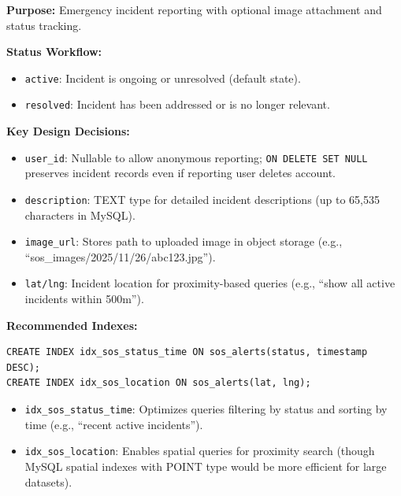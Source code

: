 \textbf{Purpose:} Emergency incident reporting with optional image attachment and status tracking.

\textbf{Status Workflow:}
\begin{itemize}
    \item \texttt{active}: Incident is ongoing or unresolved (default state).
    \item \texttt{resolved}: Incident has been addressed or is no longer relevant.
\end{itemize}

\textbf{Key Design Decisions:}
\begin{itemize}
    \item \texttt{user\_id}: Nullable to allow anonymous reporting; \texttt{ON DELETE SET NULL} preserves incident records even if reporting user deletes account.
    \item \texttt{description}: TEXT type for detailed incident descriptions (up to 65,535 characters in MySQL).
    \item \texttt{image\_url}: Stores path to uploaded image in object storage (e.g., ``sos\_images/2025/11/26/abc123.jpg'').
    \item \texttt{lat/lng}: Incident location for proximity-based queries (e.g., ``show all active incidents within 500m'').
\end{itemize}

\textbf{Recommended Indexes:}
\begin{verbatim}
CREATE INDEX idx_sos_status_time ON sos_alerts(status, timestamp DESC);
CREATE INDEX idx_sos_location ON sos_alerts(lat, lng);
\end{verbatim}

\begin{itemize}
    \item \texttt{idx\_sos\_status\_time}: Optimizes queries filtering by status and sorting by time (e.g., ``recent active incidents'').
    \item \texttt{idx\_sos\_location}: Enables spatial queries for proximity search (though MySQL spatial indexes with POINT type would be more efficient for large datasets).
\end{itemize}



